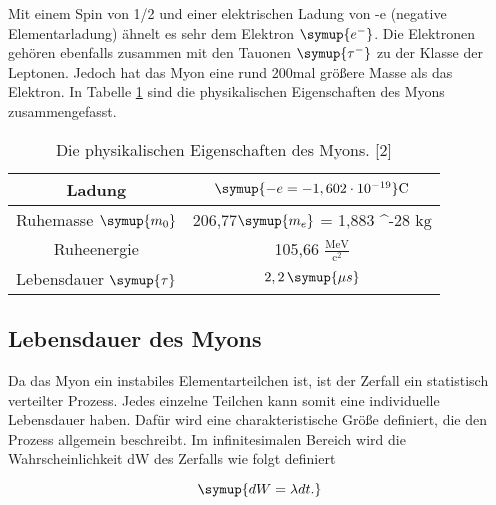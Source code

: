 \noindent Mit einem Spin von 1/2 und einer elektrischen Ladung von -e (negative Elementarladung) ähnelt es sehr dem Elektron $\symup{e^-}$. Die Elektronen gehören ebenfalls zusammen mit den Tauonen $\symup{\tau^-}$ zu der Klasse der Leptonen. Jedoch hat das Myon eine rund 200mal größere Masse als das Elektron. In Tabelle \ref{tab:Eigenschaften} sind die physikalischen Eigenschaften des Myons zusammengefasst.

\begin{table}[H]
\centering
\caption{Die physikalischen Eigenschaften des Myons. [2]}
\begin{tabular}{|c|c|}
\hline
Ladung & $\symup{-e = -1,602 \cdot 10^{-19}} \mathrm{C}$ \\
\hline
Ruhemasse $\symup{m_0}$ & 206,77$\symup{m_e}$ = 1,883 \cdot 10^{-28} $\mathrm{kg}$\\
\hline
Ruheenergie & 105,66 $\mathrm{\frac{MeV}{c^2}}$\\
\hline
Lebensdauer $\symup{\tau}$ & $2,2 \, \symup{\mu s}$\\
\hline
\end{tabular}
\label{tab:Eigenschaften}
\end{table}

\subsection{Lebensdauer des Myons}
\label{sec:Lebensdauer}
Da das Myon ein instabiles Elementarteilchen ist, ist der Zerfall ein statistisch verteilter Prozess. Jedes einzelne Teilchen kann somit eine individuelle Lebensdauer haben. Dafür wird eine charakteristische Größe definiert, die den Prozess allgemein beschreibt. Im infinitesimalen Bereich wird die Wahrscheinlichkeit dW des Zerfalls wie folgt definiert

\begin{equation}
\label{Wahrscheinlichkeit}
\symup{dW = \lambda dt .}
\end{equation}

